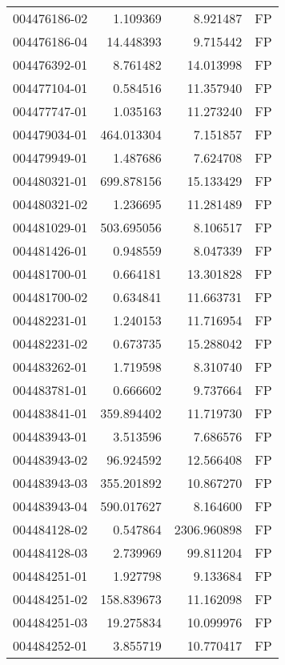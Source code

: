 \begin{tabular}{lrrl}
004476186-02 &    1.109369 &       8.921487 &   FP \\
004476186-04 &   14.448393 &       9.715442 &   FP \\
004476392-01 &    8.761482 &      14.013998 &   FP \\
004477104-01 &    0.584516 &      11.357940 &   FP \\
004477747-01 &    1.035163 &      11.273240 &   FP \\
004479034-01 &  464.013304 &       7.151857 &   FP \\
004479949-01 &    1.487686 &       7.624708 &   FP \\
004480321-01 &  699.878156 &      15.133429 &   FP \\
004480321-02 &    1.236695 &      11.281489 &   FP \\
004481029-01 &  503.695056 &       8.106517 &   FP \\
004481426-01 &    0.948559 &       8.047339 &   FP \\
004481700-01 &    0.664181 &      13.301828 &   FP \\
004481700-02 &    0.634841 &      11.663731 &   FP \\
004482231-01 &    1.240153 &      11.716954 &   FP \\
004482231-02 &    0.673735 &      15.288042 &   FP \\
004483262-01 &    1.719598 &       8.310740 &   FP \\
004483781-01 &    0.666602 &       9.737664 &   FP \\
004483841-01 &  359.894402 &      11.719730 &   FP \\
004483943-01 &    3.513596 &       7.686576 &   FP \\
004483943-02 &   96.924592 &      12.566408 &   FP \\
004483943-03 &  355.201892 &      10.867270 &   FP \\
004483943-04 &  590.017627 &       8.164600 &   FP \\
004484128-02 &    0.547864 &    2306.960898 &   FP \\
004484128-03 &    2.739969 &      99.811204 &   FP \\
004484251-01 &    1.927798 &       9.133684 &   FP \\
004484251-02 &  158.839673 &      11.162098 &   FP \\
004484251-03 &   19.275834 &      10.099976 &   FP \\
004484252-01 &    3.855719 &      10.770417 &   FP \\

\end{tabular}
